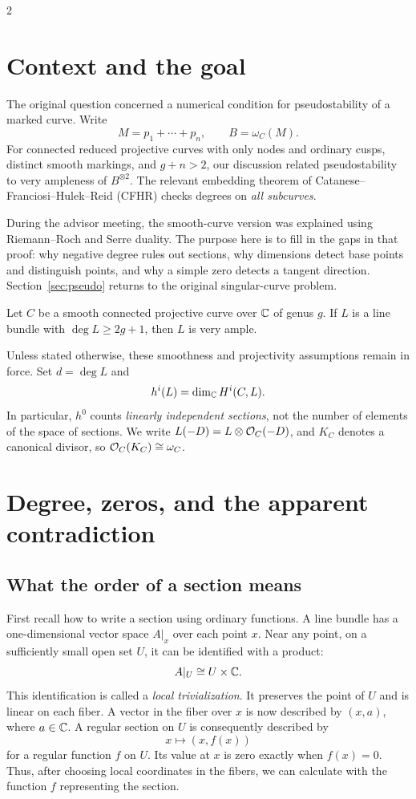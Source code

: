 \documentclass[12pt]{memoir}
\begin{document}
\begin{multicols}{2}
\raggedcolumns

\section{Context and the goal}\label{sec:context}

The original question concerned a numerical condition for
pseudostability of a marked curve. Write
\[
 M=p_1+\cdots+p_n,\qquad B=\omega_C(M).
\]
For connected reduced projective curves with only nodes and ordinary
cusps, distinct smooth markings, and $g+n>2$, our discussion related
pseudostability to very ampleness of $B^{\otimes2}$.
The relevant embedding theorem of Catanese--Franciosi--Hulek--Reid
(CFHR) checks degrees on \emph{all subcurves}.

During the advisor meeting, the smooth-curve version was explained
using Riemann--Roch and Serre duality. The purpose here is to fill in
the gaps in that proof: why negative degree rules out sections, why
dimensions detect base points and distinguish points, and why a
simple zero detects a tangent direction. Section~\ref{sec:pseudo}
returns to the original singular-curve problem.

\begin{Th}\label{th:embedding}
Let $C$ be a smooth connected projective curve over $\mathbb{C}$ of genus $g$.
If $L$ is a line bundle with $\deg L\ge 2g+1$, then $L$ is very ample.
\end{Th}

Unless stated otherwise, these smoothness and projectivity assumptions
remain in force. Set $d=\deg L$ and
\[
 h^i(L)=\dim_{\mathbb{C}}H^i(C,L).
\]
In particular, $h^0$ counts \emph{linearly independent sections}, not
the number of elements of the space of sections. We write
$L(-D)=L\otimes\mathcal{O}_C(-D)$, and $K_C$ denotes a canonical divisor,
so $\mathcal{O}_C(K_C)\cong\omega_C$.

\section{Degree, zeros, and the apparent contradiction}\label{sec:degree}

\subsection{What the order of a section means}\label{sec:local-sections}
First recall how to write a section using ordinary functions. A line
bundle has a one-dimensional vector space $A|_x$ over each point $x$.
Near any point, on a sufficiently small open set $U$, it can be
identified with a product:
\[
 A|_U\cong U\times\mathbb{C}.
\]
This identification is called a \emph{local trivialization}. It
preserves the point of $U$ and is linear on each fiber. A vector in
the fiber over $x$ is now described by $(x,a)$, where $a\in\mathbb{C}$.
A regular section on $U$ is consequently described by
\[
 x\longmapsto(x,f(x))
\]
for a regular function $f$ on $U$. Its value at $x$ is zero exactly
when $f(x)=0$. Thus, after choosing local coordinates in the fibers,
we can calculate with the function $f$ representing the section.


\end{multicols}
\end{document}
